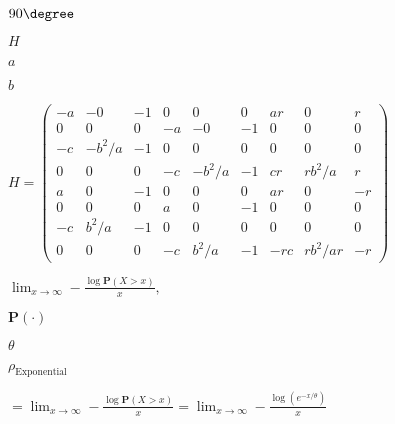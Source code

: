 \documentclass{article}
\def\lthtmlcheckvsize{\ifdim\ht\sizebox<\vsize 
  \ifdim\wd\sizebox<\hsize\expandafter\hfill\fi \expandafter\vfill
  \else\expandafter\vss\fi}%
\begin{document}
{\newpage\clearpage
{}%
$ 90 \degree$%
\lthtmlindisplaymathZ
\lthtmlcheckvsize\clearpage}

{\newpage\clearpage
{}%
$ H$%
\lthtmlindisplaymathZ
\lthtmlcheckvsize\clearpage}

{\newpage\clearpage
{}%
$ a$%
\lthtmlindisplaymathZ
\lthtmlcheckvsize\clearpage}

{\newpage\clearpage
{}%
$ b$%
\lthtmlindisplaymathZ
\lthtmlcheckvsize\clearpage}

{\newpage\clearpage
{}%
$\displaystyle H=
\begin{pmatrix}
  -a &-0 &-1 &0 &0 &0 &ar &0 &r \\
  0 &0 &0 &-a &-0 &-1 & 0& 0 &0 \\
  -c &-b^2/a& -1& 0& 0& 0 &0& 0& 0 \\
  0 &0 &0 &-c &-b^2/a &-1 &cr &rb^2/a& r\\
  a &0 &-1& 0& 0 &0 & ar &0 &-r \\
  0 &0 &0 &a &0 &-1 &0 &0 &0\\
  -c &b^2/a& -1& 0& 0& 0& 0& 0& 0 \\
  0 &0 &0 &-c &b^2/a &-1 &-rc &rb^2/ar &-r 
\end{pmatrix}
$%
\lthtmlindisplaymathZ
\lthtmlcheckvsize\clearpage}

{\newpage\clearpage
{}%
$\displaystyle \lim_{x \rightarrow \infty} -\frac{\log\textbf{P}(X > x)}{x},$%
\lthtmlindisplaymathZ
\lthtmlcheckvsize\clearpage}

{\newpage\clearpage
{}%
$ \textbf{P}(\cdot)$%
\lthtmlindisplaymathZ
\lthtmlcheckvsize\clearpage}

{\newpage\clearpage
{}%
$ \theta$%
\lthtmlindisplaymathZ
\lthtmlcheckvsize\clearpage}

{\newpage\clearpage
{}%
$\displaystyle \rho_{\text{Exponential}}$%
\lthtmlindisplaymathZ
\lthtmlcheckvsize\clearpage}

{\newpage\clearpage
{}%
$\displaystyle =\lim_{x \rightarrow \infty} -\frac{\log\textbf{P}(X > x)}{x}  = \lim_{x \rightarrow \infty} -\frac{\log(e^{- x/\theta})}{x}$%
\lthtmlindisplaymathZ
\lthtmlcheckvsize\clearpage}
\end{document}

